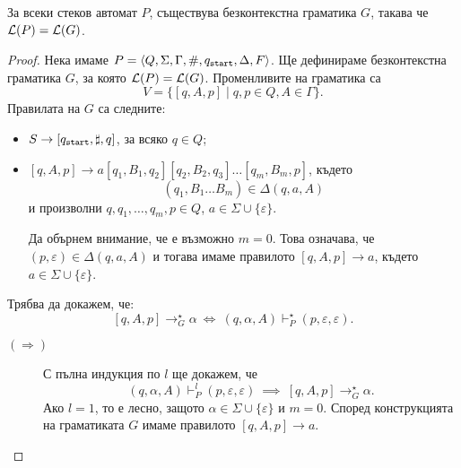 \begin{framed}
  \begin{lemma}
    За всеки стеков автомат $P$, съществува безконтекстна граматика $G$, такава че $\mathcal{L}(P) = \mathcal{L}(G)$.
  \end{lemma}
\end{framed}
\begin{proof}
  Нека имаме $P = \langle{Q,\Sigma,\Gamma,\#,q_{\texttt{start}},\Delta,F}\rangle$.
  Ще дефинираме безконтекстна граматика $G$, за която $\mathcal{L}(P) = \mathcal{L}(G)$.
  Променливите на граматика са 
  \[V = \{[q,A,p] \mid q,p \in Q, A \in \Gamma\}.\]
  Правилата на $G$ са следните:
  \begin{itemize}
  \item
    $S \to [q_{\texttt{start}},\sharp,q]$, за всяко $q \in Q$;
  \item
    $[q,A,p] \to a[q_1,B_1,q_2][q_2,B_2,q_3]\dots [q_m,B_m,p]$,
    където 
    \[(q_1,B_1\dots B_m) \in \Delta(q, a, A)\]
    и произволни $q,q_1,\dots,q_{m},p \in Q$,
    $a \in \Sigma \cup \{\varepsilon\}$.
    
    Да обърнем внимание, че е възможно $m = 0$.
    Това означава, че $(p,\varepsilon) \in \Delta(q, a, A)$ и тогава имаме правилото $[q,A,p] \to a$, където $a \in \Sigma \cup \{\varepsilon\}$.
  \end{itemize}
  Трябва да докажем, че:
  \[[q,A,p] \rightarrow^\star_G \alpha\ \Leftrightarrow\ (q,\alpha,A) \vdash^\star_P (p,\varepsilon,\varepsilon).\]
  \begin{description}
  \item[$(\Rightarrow)$]
    С пълна индукция по $l$ ще докажем, че 
    \[(q,\alpha,A) \vdash^l_P (p,\varepsilon,\varepsilon)\ \implies\ [q,A,p] \to^\star_G \alpha.\]
    Ако $l = 1$, то е лесно, защото $\alpha \in \Sigma \cup\{\varepsilon\}$ и $m = 0$.
    Според конструкцията на граматиката $G$ имаме правилото $[q,A,p] \to a$.
    

\end{description}
\end{proof}
